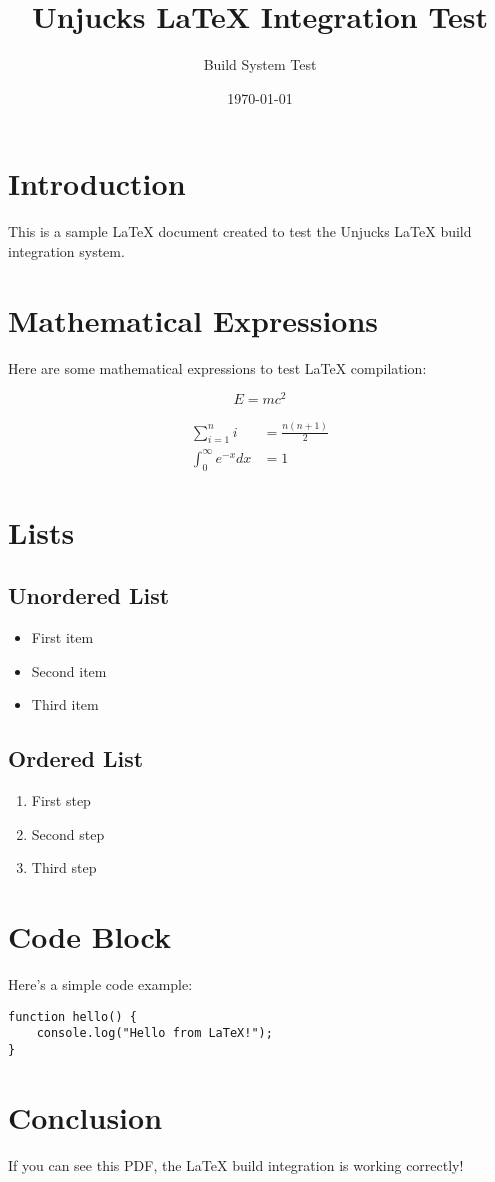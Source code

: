 \documentclass[11pt,a4paper]{article}
\title{Unjucks LaTeX Integration Test}
\author{Build System Test}
\date{\today}
\begin{document}
\maketitle

\section{Introduction}
This is a sample LaTeX document created to test the Unjucks LaTeX build integration system.

\section{Mathematical Expressions}
Here are some mathematical expressions to test LaTeX compilation:

\begin{equation}
E = mc^2
\end{equation}

\begin{align}
\sum_{i=1}^{n} i &= \frac{n(n+1)}{2} \\
\int_{0}^{\infty} e^{-x} dx &= 1
\end{align}

\section{Lists}
\subsection{Unordered List}
\begin{itemize}
    \item First item
    \item Second item
    \item Third item
\end{itemize}

\subsection{Ordered List}
\begin{enumerate}
    \item First step
    \item Second step
    \item Third step
\end{enumerate}

\section{Code Block}
Here's a simple code example:

\begin{verbatim}
function hello() {
    console.log("Hello from LaTeX!");
}
\end{verbatim}

\section{Conclusion}
If you can see this PDF, the LaTeX build integration is working correctly!
\end{document}
